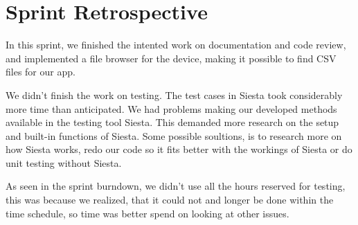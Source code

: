 \section{Sprint Retrospective} %
\label{sec:Sprint Retrospective}

In this sprint, we finished the intented work on documentation and code review, and implemented a file browser for the device, making it possible to find CSV files for our app. 

We didn't finish the work on testing. The test cases in Siesta took considerably more time than anticipated. We had problems making our developed methods available in the testing tool Siesta. 
This demanded more research on the setup and built-in functions of Siesta. Some possible soultions, is to research more on how Siesta works, redo our code so it 
fits better with the workings of Siesta or do unit testing without Siesta.

As seen in the sprint burndown, we didn't use all the hours reserved for testing, this was because we realized, that it could not and longer be done within the 
time schedule, so time was better spend on looking at other issues.


